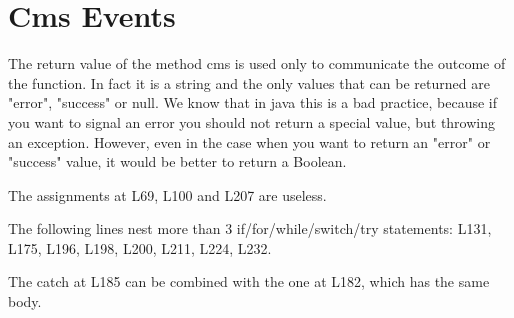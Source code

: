 \section{Cms Events}

The return value of the method cms is used only to communicate the outcome of the function. In fact it is a string and the only values that can be returned are "error", "success" or null. We know that in java this is a bad practice, because if you want to signal an error you should not return a special value, but throwing an exception. However, even in the case when you want to return an "error" or "success" value, it would be better to return a Boolean.

The assignments at L69, L100 and L207 are useless.

The following lines nest more than 3 if/for/while/switch/try statements: L131, L175, L196, L198, L200, L211, L224, L232.

The catch at L185 can be combined with the one at L182, which has the same body.